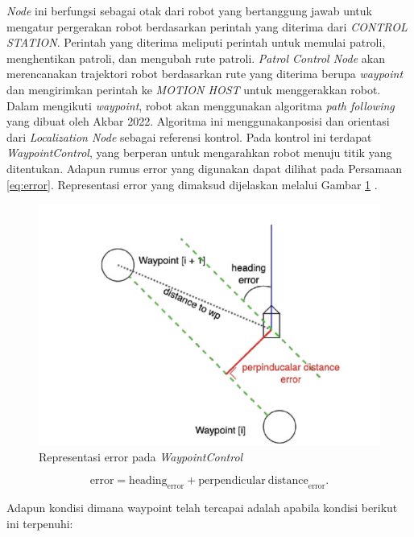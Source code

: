 \emph{Node} ini berfungsi sebagai otak
 dari robot yang bertanggung jawab untuk mengatur pergerakan robot berdasarkan perintah yang diterima dari \emph{CONTROL STATION}. Perintah yang diterima meliputi perintah untuk memulai patroli, menghentikan patroli, dan mengubah rute patroli. \emph{Patrol Control Node} akan merencanakan trajektori robot berdasarkan rute yang diterima berupa \emph{waypoint} dan mengirimkan perintah ke \emph{MOTION HOST} untuk menggerakkan robot. Dalam mengikuti \emph{waypoint}, robot akan menggunakan algoritma \emph{path following} yang dibuat oleh Akbar 2022. Algoritma ini menggunakanposisi dan orientasi dari \emph{Localization Node} sebagai referensi kontrol. Pada kontrol ini terdapat \emph{WaypointControl}, yang berperan untuk mengarahkan robot menuju titik yang ditentukan. Adapun rumus error yang digunakan dapat dilihat pada Persamaan \ref{eq:error}. Representasi error yang dimaksud dijelaskan melalui Gambar \ref{fig:error_waypointcontrol} \cite{zidan2022}.

\begin{figure}[H] \centering
  \includegraphics[scale=0.8]{gambar/waypoint_control.png}
  \caption{Representasi error pada \emph{WaypointControl}}
  \label{fig:error_waypointcontrol}
\end{figure}

\begin{equation}
  \label{eq:error}
  \mathrm{error} = \mathrm{heading}_{\mathrm{error}} + \mathrm{perpendicular\ distance}_{\mathrm{error}}.
\end{equation}

Adapun kondisi dimana waypoint telah tercapai adalah apabila kondisi berikut ini terpenuhi:

